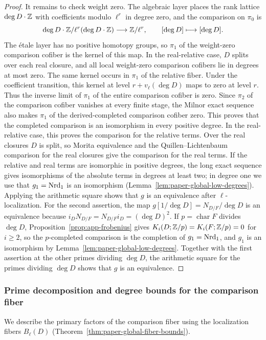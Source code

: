 \begin{proof}
It remains to check weight zero.
The algebraic layer places the rank lattice $\deg D\cdot\mathbb Z$ with coefficients modulo $\ell^r$ in degree zero, and the comparison on $\pi_0$ is
\[
 \deg D\cdot\mathbb Z/\ell^r(\deg D\cdot\mathbb Z)\longrightarrow\mathbb Z/\ell^r,\qquad [\deg D]\longmapsto [\deg D].
\]
The \'etale layer has no positive homotopy groups, so $\pi_1$ of the weight-zero comparison cofiber is the kernel of this map.
In the real-relative case, $D$ splits over each real closure, and all local weight-zero comparison cofibers lie in degrees at most zero.
The same kernel occurs in $\pi_1$ of the relative fiber.
Under the coefficient transition, this kernel at level $r+v_\ell(\deg D)$ maps to zero at level $r$.
Thus the inverse limit of $\pi_1$ of the entire comparison cofiber is zero.
Since $\pi_2$ of the comparison cofiber vanishes at every finite stage, the Milnor exact sequence also makes $\pi_1$ of the derived-completed comparison cofiber zero.
This proves that the completed comparison is an isomorphism in every positive degree.
In the real-relative case, this proves the comparison for the relative terms.
Over the real closures $D$ is split, so Morita equivalence and the Quillen--Lichtenbaum comparison for the real closures give the comparison for the real terms.
If the relative and real terms are isomorphic in positive degrees, the long exact sequence gives isomorphisms of the absolute terms in degrees at least two; in degree one we use that $g_1=\operatorname{Nrd}_1$ is an isomorphism (Lemma~\ref{lem:paper-global-low-degrees}).
Applying the arithmetic square shows that $g$ is an equivalence after $\ell$-localization.
For the second assertion, the map $g[1/\deg D]=N_{D/F}/\deg D$ is an equivalence because $i_DN_{D/F}=N_{D/F}i_D=(\deg D)^2$.
If $p=\operatorname{char}F$ divides $\deg D$, Proposition~\ref{prop:app-frobenius} gives $K_i(D;\mathbb Z/p)=K_i(F;\mathbb Z/p)=0$ for $i\ge2$, so the $p$-completed comparison is the completion of $g_1=\operatorname{Nrd}_1$, and $g_1$ is an isomorphism by Lemma~\ref{lem:paper-global-low-degrees}.
Together with the first assertion at the other primes dividing $\deg D$, the arithmetic square for the primes dividing $\deg D$ shows that $g$ is an equivalence.
\end{proof}

\subsubsection{Prime decomposition and degree bounds for the comparison fiber}
We describe the primary factors of the comparison fiber using the localization fibers $B_\ell(D)$ (Theorem~\ref{thm:paper-global-fiber-bounds}).

